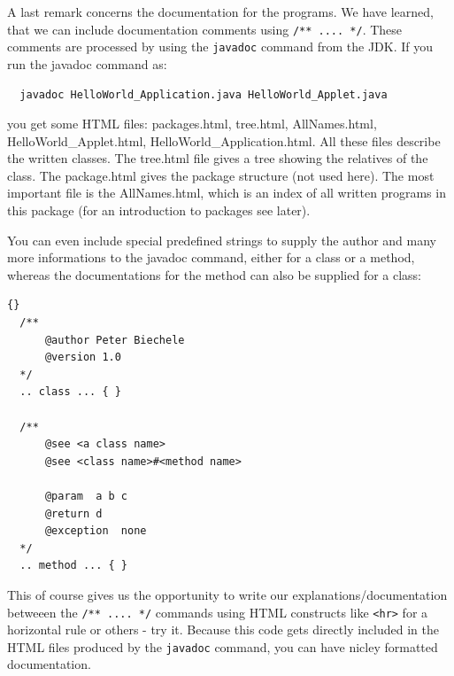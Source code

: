 A last remark concerns the documentation for the programs. We have
learned, that we can include documentation comments using 
\verb|/** .... */|. These comments are processed by using the
\verb|javadoc| command from the JDK. If you run the javadoc command as: 
\begin{verbatim}
  javadoc HelloWorld_Application.java HelloWorld_Applet.java  
\end{verbatim}
you get some HTML files: packages.html, tree.html, AllNames.html,
HelloWorld\_Applet.html, HelloWorld\_Application.html. All these
files describe the written classes. The tree.html file gives a tree
showing the relatives of the class. The package.html gives the
package structure (not used here). The most important file is the
AllNames.html, which is an index of all written programs in this package
(for an introduction to packages see later).

You can even include special predefined strings to supply the
author and many more informations to the javadoc command, either
for a class or a method, whereas the documentations for the method
can also be supplied for a class:
\begin{lstlisting}{}
  /**
      @author Peter Biechele
      @version 1.0
  */
  .. class ... { }

  /** 
      @see <a class name>
      @see <class name>#<method name>

      @param  a b c
      @return d
      @exception  none
  */
  .. method ... { }
\end{lstlisting}

This of course gives us the opportunity to write our 
explanations/documentation
betweeen the \verb|/** .... */| commands using HTML constructs like
\verb|<hr>| for a horizontal rule or others - try it. 
Because this code gets directly included in the HTML files produced by
the \verb|javadoc| command, you can have nicley formatted documentation.

